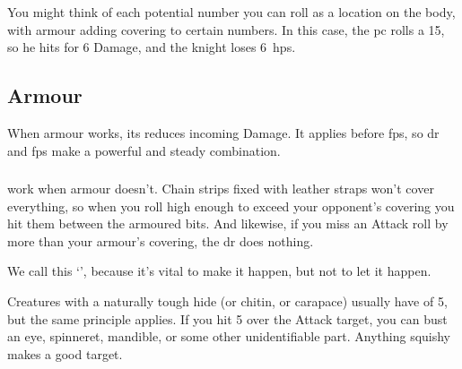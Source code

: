 \begin{multicols}{2}
{\begin{exampletext}
  You might think of each potential number you can roll as a location on the body, with armour adding \gls{covering} to certain numbers.
  In this case, the \gls{pc} rolls a 15, so he hits for 6 Damage, and the knight loses 6~\glspl{hp}.
  \end{exampletext}

}{

}

\subsection{Armour}

When armour works, its  reduces incoming Damage.
It applies before \glspl{fp}, so \gls{dr} and \glspl{fp} make a powerful and steady combination.

\subsubsection{}
\label{vitals}
work when armour doesn't.
Chain strips fixed with leather straps won't cover everything, so when you roll high enough to exceed your opponent's \gls{covering} you hit them between the armoured bits.
And likewise, if you miss an Attack roll by more than your armour's \gls{covering}, the \gls{dr} does nothing.

We call this `', because it's vital to make it happen, but not to let it happen.

Creatures with a naturally tough hide (or chitin, or carapace) usually have  of 5, but the same principle applies.
If you hit 5 over the Attack target, you can bust an eye, spinneret, mandible, or some other unidentifiable part.
Anything squishy makes a good target.


\end{multicols}
